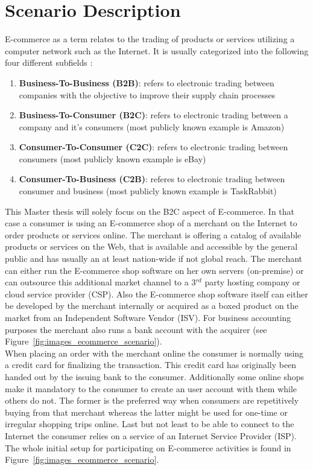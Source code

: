
\section{Scenario Description}
\label{sec:scenario_description}

E-commerce as a term relates to the trading of products or services utilizing a computer network such as the Internet. It is usually categorized into the following four different subfields \citep{sen2015study}:\@

\begin{enumerate}
  \item \textbf{Business-To-Business (B2B)}: refers to electronic trading between companies with the objective to improve their supply chain processes
  \item \textbf{Business-To-Consumer (B2C)}: refers to electronic trading between a company and it's consumers (most publicly known example is Amazon)
  \item \textbf{Consumer-To-Consumer (C2C)}: refers to electronic trading between consumers (most publicly known example is eBay)
  \item \textbf{Consumer-To-Business (C2B)}: referes to electronic trading between consumer and business (most publicly known example is TaskRabbit)
\end{enumerate}

This Master thesis will solely focus on the B2C aspect of E-commerce. In that case a consumer is using an E-commerce shop of a merchant on the Internet to order products or services online. The merchant is offering a catalog of available products or services on the Web, that is available and accessible by the general public and has usually an at least nation-wide if not global reach. The merchant can either run the E-commerce shop software on her own servers (on-premise) or can outsource this additional market channel to a 3$^{rd}$ party hosting company or cloud service provider (CSP). Also the E-commerce shop software itself can either be developed by the merchant internally or acquired as a boxed product on the market from an Independent Software Vendor (ISV). For business accounting purposes the merchant also runs a bank account with the acquirer (see Figure~\ref{fig:images_ecommerce_scenario}). \\
When placing an order with the merchant online the consumer is normally using a credit card for finalizing the transaction. This credit card has originally been handed out by the issuing bank to the consumer. Additionally some online shops make it mandatory to the consumer to create an user account with them while others do not. The former is the preferred way when consumers are repetitively buying from that merchant whereas the latter might be used for one-time or irregular shopping trips online. Last but not least to be able to connect to the Internet the consumer relies on a service of an Internet Service Provider (ISP). The whole initial setup for participating on E-commerce activities is found in Figure~\ref{fig:images_ecommerce_scenario}.\@

